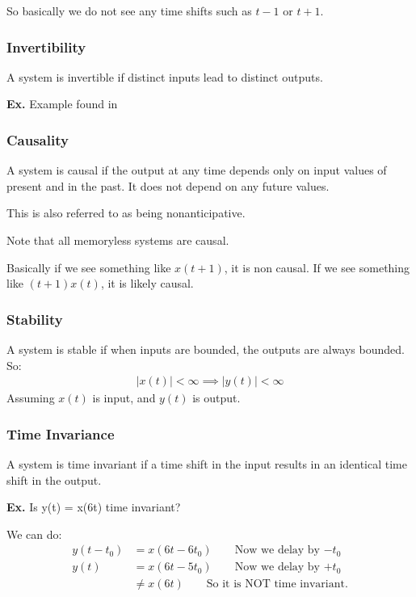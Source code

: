 \documentclass[12pt,letterpaper]{article} \usepackage{amsmath} \usepackage{graphicx} \usepackage[margin=1in]{geometry} \usepackage{longtable}  \usepackage{amssymb}
\begin{document}
	So basically we do not see any time shifts such as $t-1$ or $t+1$.
	
	\subsubsection{Invertibility}
	A system is invertible if distinct inputs lead to distinct outputs. 
	
	\begin{mdframed}
		\textbf{Ex.} Example found in 
	\end{mdframed}
	
	\subsubsection{Causality}
	A system is causal if the output at any time depends only on input values of present and in the past. It does not depend on any future values. 
	
	This is also referred to as being nonanticipative.
	
	Note that all memoryless systems are causal.
	
	Basically if we see something like $x(t+1)$, it is non causal. If we see something like $(t+1) x(t)$, it is likely causal. 
	
	\subsubsection{Stability}
	A system is stable if when inputs are bounded, the outputs are always bounded. So:
	\begin{align}
		|x(t)| < \infty \implies |y(t)| < \infty 
	\end{align}
	Assuming $x(t)$ is input, and $y(t)$ is output.
	
	\subsubsection{Time Invariance}
	A system is time invariant if a time shift in the input results in an identical time shift in the output. 
	
	\begin{mdframed}
		\textbf{Ex.} Is y(t) = x(6t) time invariant?
		
		We can do:
		\begin{align*}
			y(t-t_0) &= x(6t-6t_0) \qquad \text{Now we delay by $-t_0$}\\
			y(t) &= x(6t-5t_0)  \qquad \text{Now we delay by $+t_0$}\\
			&\ne x(6t) \qquad \text{So it is NOT time invariant.}
		\end{align*}
	\end{mdframed}
\end{document}
